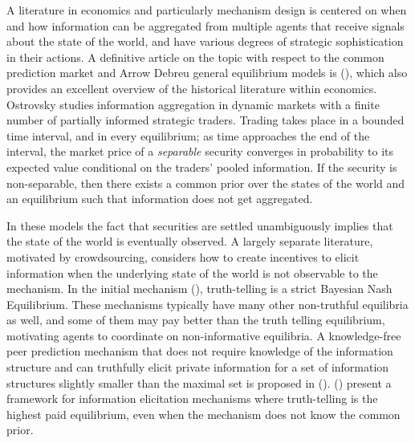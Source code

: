 A literature in economics and particularly mechanism design is centered on when and how information can be aggregated from multiple agents that receive signals about the state of the world, and have various degrees of strategic sophistication in their actions.
A definitive article on the topic with respect to the common prediction market and Arrow Debreu general equilibrium models is (\cite{ostrovsky2012information}), which also provides an excellent overview of the historical literature within economics.
Ostrovsky studies information aggregation in dynamic markets with a finite number of partially informed strategic traders. 
Trading takes place in a bounded time interval, and in every equilibrium; as time approaches the end of the interval, the market price of a \emph{separable} security converges in probability to its expected value conditional on the traders' pooled information. If the security is non-separable, then there exists a common prior over the states of the world and an equilibrium such that information does not get aggregated. 


In these models the fact that securities are settled unambiguously implies that the state of the world is eventually observed.
A largely separate literature, motivated by crowdsourcing, considers how to create incentives to elicit information when the underlying state of the world is not observable to the mechanism. 
In the initial mechanism (\cite{prelec2004bayesian,miller2005eliciting}), truth-telling is a strict Bayesian Nash Equilibrium. These mechanisms typically have many other non-truthful equilibria as well, and some of them may pay better than the truth telling equilibrium, motivating agents to coordinate on non-informative equilibria.
A knowledge-free peer prediction mechanism that does not require knowledge of the information structure and can truthfully elicit private information for a set of information structures slightly smaller than the maximal set is proposed in (\cite{zhang2014elicitability}).
(\cite{kong2016framework}) present a framework for information elicitation mechanisms where truth-telling is the highest paid equilibrium, even when the mechanism does not know the common prior.









